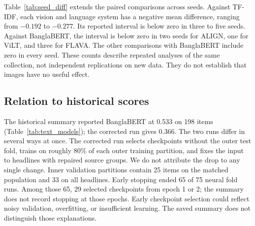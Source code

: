 \documentclass[11pt]{article}
\begin{document}
Table~\ref{tab:seed_diff} extends the paired comparisons across seeds. %
Against TF-IDF, each vision and language system has a negative mean difference, ranging from $-0.192$ to $-0.277$. Its reported interval is below zero in three to five seeds. Against BanglaBERT, the interval is below zero in two seeds for ALIGN, one for ViLT, and three for FLAVA. The other comparisons with BanglaBERT include zero in every seed. These counts describe repeated analyses of the same collection, not independent replications on new data. They do not establish that images have no useful effect. %

\begin{table}[t]
\footnotesize
\setlength{\tabcolsep}{2pt}
\centering
\caption{Saved paired macro F1 differences across five seeds. Each comparison records 86 items and 85 source groups. CI$<$0 counts intervals entirely below zero. Counts are descriptive and do not correct for multiple comparisons.}\label{tab:seed_diff}
\end{table}

\subsection{Relation to historical scores}
The historical summary reported BanglaBERT at 0.533 on 198 items (Table~\ref{tab:text_models}); the corrected run gives 0.366. %
The two runs differ in several ways at once. The corrected run selects checkpoints without the outer test fold, trains on roughly 80\% of each outer training partition, and fixes the input to headlines with repaired source groups. We do not attribute the drop to any single change. Inner validation partitions contain 25 items on the matched population and 33 on all headlines. Early stopping ended 65 of 75 neural fold runs. Among those 65, 29 selected checkpoints from epoch 1 or 2; the summary does not record stopping at those epochs. %
Early checkpoint selection could reflect noisy validation, overfitting, or insufficient learning. The saved summary does not distinguish those explanations.
\end{document}
